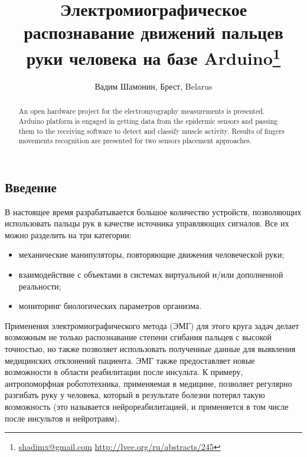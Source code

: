\documentclass[10pt, a5paper]{article}
\begin{document}
\title{Электромиографическое распознавание движений пальцев руки человека на базе Arduino\footnote{\url{shadimx@gmail.com} \url{http://lvee.org/ru/abstracts/245}}}
\author{Вадим Шамонин, Брест, Belarus}
\maketitle
\begin{abstract}
An open hardware project for the electromyography measurements is presented. Arduino platform is engaged in getting data from the epidermic sensors and passing them to the receiving software to detect and classify muscle activity. Results of fingers movements recognition are presented for two sensors placement approaches.
\end{abstract}
\subsection*{Введение}

В настоящее время разрабатывается большое количество устройств, позволяющих использовать пальцы рук в качестве источника управляющих сигналов. Все их можно разделить на три категории:

\begin{itemize}
  \item механические манипуляторы, повторяющие движения человеческой руки;
  \item взаимодействие с объектами в системах виртуальной и/или дополненной реальности;
  \item мониторинг биологических параметров организма.
\end{itemize}

Применения электромиографического метода (ЭМГ) для этого круга задач делает возможным не только распознавание степени сгибания пальцев с высокой точностью, но также позволяет использовать полученные данные для выявления медицинских отклонений пациента. ЭМГ также предоставляет новые возможности в области реабилитации после инсульта. К примеру, антропоморфная робототехника, применяемая в медицине, позволяет регулярно разгибать руку у человека, который в результате болезни потерял такую возможность (это называется нейрореабилитацией, и применяется в том числе после инсультов и нейротравм).
\end{document}
